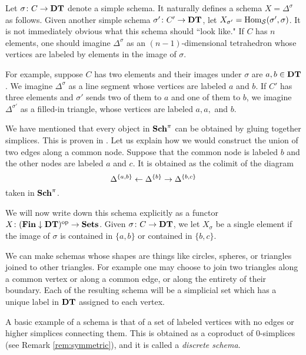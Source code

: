 \documentclass{amsart}
\def\DT{{\bf DT}}
\def\Sch{{\bf Sch}}
\def\Fin{{\bf Fin}}
\begin{document}
\begin{example}\label{ex:simplices}

Let $\sigma\taking C\to\DT$ denote a simple schema.  It naturally defines a schema $X=\Delta^\sigma$ as follows.  Given another simple schema $\sigma'\taking C'\to\DT$, let $X_{\sigma'}=\textnormal{Hom}_\mathcal{S}(\sigma',\sigma)$.  It is not immediately obvious what this schema should ``look like."  If $C$ has $n$ elements, one should imagine $\Delta^\sigma$ as an $(n-1)$-dimensional tetrahedron whose vertices are labeled by elements in the image of $\sigma$.

For example, suppose $C$ has two elements and their images under $\sigma$ are $a,b\in\DT$.  We imagine $\Delta^\sigma$ as a line segment whose vertices are labeled $a$ and $b$.  If $C'$ has three elements and $\sigma'$ sends two of them to $a$ and one of them to $b$, we imagine $\Delta^{\sigma'}$ as a filled-in triangle, whose vertices are labeled $a,a,$ and $b$. 

\end{example}

\begin{example}

We have mentioned that every object in $\Sch^\pi$ can be obtained by gluing together simplices.  This is proven in \cite{Jardine}.  Let us explain how we would construct the union of two edges along a common node.  Suppose that the common node is labeled $b$ and the other nodes are labeled $a$ and $c$.  It is obtained as the colimit of the diagram $$\Delta^{\{a,b\}}\leftarrow\Delta^{\{b\}}\rightarrow\Delta^{\{b,c\}}$$ taken in $\Sch^\pi$.

We will now write down this schema explicitly as a functor $X\taking(\Fin\down\DT)\op\to\Sets$.  Given $\sigma\taking C\to\DT$, we let $X_\sigma$ be a single element if the image of $\sigma$ is contained in $\{a,b\}$ or contained in $\{b,c\}$.  

\end{example}

\begin{example}\label{ex:gluing}

We can make schemas whose shapes are things like circles, spheres, or triangles joined to other triangles.  For example one may choose to join two triangles along a common vertex or along a common edge, or along the entirety of their boundary.  Each of the resulting schema will be a simplicial set which has a unique label in $\DT$ assigned to each vertex.

A basic example of a schema is that of a set of labeled vertices with no edges or higher simplices connecting them.  This is obtained as a coproduct of $0$-simplices (see Remark \ref{rem:symmetric}), and it is called a {\em discrete schema}.

\end{example}
\end{document}
